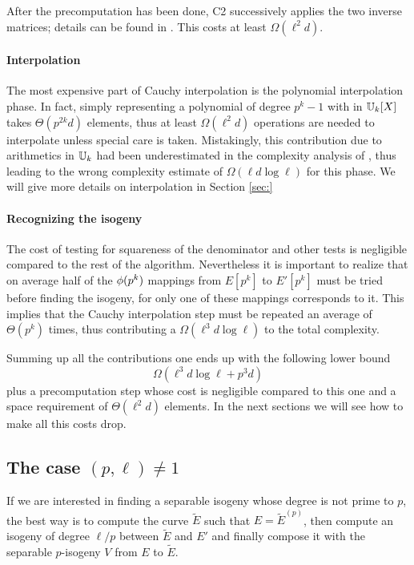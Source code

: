 After the precomputation has been done, C2 successively applies the
two inverse matrices; details can be found in
\cite[$\S$2.4]{Cou96}. This costs at least $\Omega(\ell^2d)$.


\paragraph{Interpolation}
The most expensive part of Cauchy interpolation is the polynomial
interpolation phase. In fact, simply representing a polynomial of
degree $p^k-1$ with in $\mathbb{U}_k[X]$ takes $\Theta(p^{2k}d)$ elements,
thus at least $\Omega(\ell^2d)$ operations are needed to interpolate
unless special care is taken. Mistakingly, this contribution due to
arithmetics in $\mathbb{U}_k$ had been underestimated in the complexity
analysis of \cite{Cou96}, thus leading to the wrong complexity
estimate of $\Omega(\ell d\log\ell)$ for this phase. We will give more
details on interpolation in Section \ref{sec:}


\paragraph{Recognizing the isogeny}
The cost of testing for squareness of the denominator and other tests
is negligible compared to the rest of the algorithm. Nevertheless it
is important to realize that on average half of the $\phi(p^k)$
mappings from $E[p^k]$ to $E'[p^k]$ must be tried before finding the
isogeny, for only one of these mappings corresponds to it. This
implies that the Cauchy interpolation step must be repeated an average
of $\Theta(p^k)$ times, thus contributing a $\Omega(\ell^3d\log\ell)$
to the total complexity.

Summing up all the contributions one ends up with the following lower
bound
\begin{equation}
  \label{eq:C2:complexity}
  \Omega(\ell^3d\log\ell + p^3d)
\end{equation}
plus a precomputation step whose cost is negligible compared to this
one and a space requirement of $\Theta(\ell^2d)$ elements. In the next
sections we will see how to make all this costs drop.


\subsection{The case $(p,\ell)\ne1$}
\label{sec:C2:non-prime}
If we are interested in finding a separable isogeny whose degree is
not prime to $p$, the best way is to compute the curve $\widetilde{E}$
such that $E = \widetilde{E}^{(p)}$, then compute an isogeny of degree
$\ell/p$ between $\widetilde{E}$ and $E'$ and finally compose it with
the separable $p$-isogeny $V$ from $E$ to $\widetilde{E}$.

